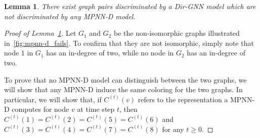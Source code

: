 \documentclass{article}
\newcommand\oursacro{Dir-GNN}
\theoremstyle{plain}
\newtheorem{lemma}[theorem]{Lemma}
\theoremstyle{definition}
\theoremstyle{remark}
\begin{document}
\begin{lemma}\label{lemma:exists-graphs-distinguished-by-dirgnn-but-not-by-mpnn-d}
    There exist graph pairs discriminated by a \oursacro{} model which are not discriminated by any MPNN-D model.
\end{lemma}
\begin{proof}[Proof of Lemma~\ref{lemma:exists-graphs-distinguished-by-dirgnn-but-not-by-mpnn-d}]
    Let $G_1$ and $G_2$ be the non-isomorphic graphs illustrated in~\cref{fig:mpnn-d_fails}. To confirm that they are not isomorphic, simply note that node $1$ in $G_1$ has an in-degree of two, while no node in $G_2$ has an in-degree of two. 
    
    To prove that no MPNN-D model can distinguish between the two graphs, we will show that any MPNN-D induce the same coloring for the two graphs. In particular, we will show that, if $C^{(t)}(v)$ refers to the representation a MPNN-D computes for node $v$ at time step $t$, then $C^{(t)}(1) = C^{(t)}(2) = C^{(t)}(5) = C^{(t)}(6)$ and $C^{(t)}(3) = C^{(t)}(4) = C^{(t)}(7) = C^{(t)}(8)$ for any $t \geq 0$.


\end{proof}
\end{document}
